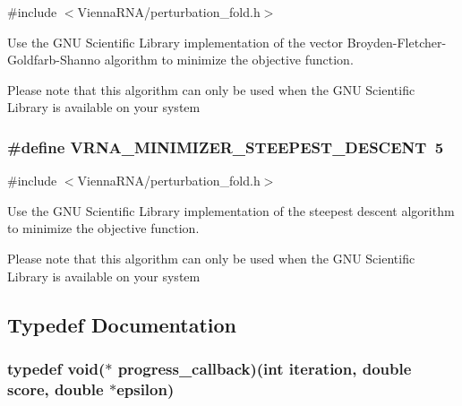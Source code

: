 {\ttfamily \#include $<$Vienna\-R\-N\-A/perturbation\-\_\-fold.\-h$>$}



Use the G\-N\-U Scientific Library implementation of the vector Broyden-\/\-Fletcher-\/\-Goldfarb-\/\-Shanno algorithm to minimize the objective function. 

Please note that this algorithm can only be used when the G\-N\-U Scientific Library is available on your system \hypertarget{group__soft__constraints_ga9ecd2144c2ebed7533233da3986521b0}{
\subsubsection[{V\-R\-N\-A\-\_\-\-M\-I\-N\-I\-M\-I\-Z\-E\-R\-\_\-\-S\-T\-E\-E\-P\-E\-S\-T\-\_\-\-D\-E\-S\-C\-E\-N\-T}]{\setlength{\rightskip}{0pt plus 5cm}\#define V\-R\-N\-A\-\_\-\-M\-I\-N\-I\-M\-I\-Z\-E\-R\-\_\-\-S\-T\-E\-E\-P\-E\-S\-T\-\_\-\-D\-E\-S\-C\-E\-N\-T~5}}\label{group__soft__constraints_ga9ecd2144c2ebed7533233da3986521b0}


{\ttfamily \#include $<$Vienna\-R\-N\-A/perturbation\-\_\-fold.\-h$>$}



Use the G\-N\-U Scientific Library implementation of the steepest descent algorithm to minimize the objective function. 

Please note that this algorithm can only be used when the G\-N\-U Scientific Library is available on your system 

\subsection{Typedef Documentation}
\hypertarget{group__soft__constraints_gafd57325a0fa4307cd72f933107f9d493}{
\subsubsection[{progress\-\_\-callback}]{\setlength{\rightskip}{0pt plus 5cm}typedef void($\ast$ progress\-\_\-callback)(int iteration, double score, double $\ast$epsilon)}}\label{group__soft__constraints_gafd57325a0fa4307cd72f933107f9d493}


